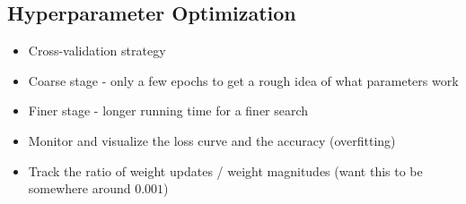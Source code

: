 \subsection{Hyperparameter Optimization}
\begin{itemize}
	\item Cross-validation strategy
	\item Coarse stage - only a few epochs to get a rough idea of what parameters work
	\item Finer stage - longer running time for a finer search
	\item Monitor and visualize the loss curve and the accuracy (overfitting)
	\item Track the ratio of weight updates / weight magnitudes (want this to be somewhere around $0.001$)
\end{itemize}